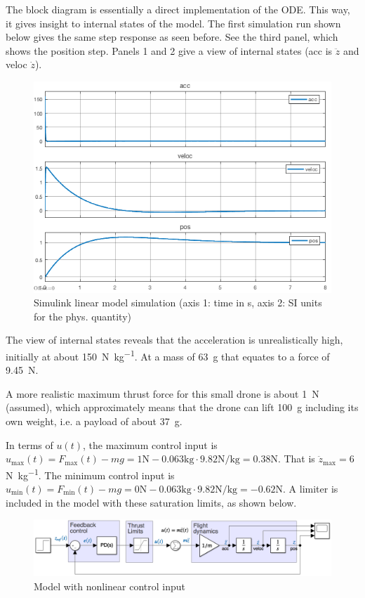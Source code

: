 \documentclass[a4paper]{report}
\begin{document}
The block diagram is essentially a direct implementation of the \gls{ODE}. This way, it gives insight to internal states of the model.
The first simulation run shown below gives the same step response as seen before.
See the third panel, which shows the position step.
Panels 1 and 2 give a view of internal states (acc is $\ddot{z}$ and veloc $\dot{z}$).

\begin{figure}[H]
\centering
\includegraphics[width=12cm]{img/simulink_1d_sim1.png}
\caption{Simulink linear model simulation (axis 1: time in \si{\second}, axis 2: SI units for the phys. quantity) \label{fig:simulink_1d_sim1}}
\end{figure}

The view of internal states reveals that the acceleration is unrealistically high, initially at about \SI{150}{\newton\per\kilo\gram}. 
At a mass of \SI{63}{\gram} that equates to a force of \SI{9.45}{\newton}.

A more realistic maximum thrust force for this small drone is about \SI{1}{\newton} (assumed), which approximately means that the drone can lift \SI{100}{\gram} including its own weight, i.e. a payload of about \SI{37}{\gram}.

In terms of $u(t)$, the maximum control input is $u_\text{max}(t) = F_\text{max}(t)-mg=1 \text{N} - 0.063 \text{kg}\cdot 9.82 \text{N/kg} = 0.38 \text{N}$. 
That is $\ddot{z}_\text{max}=6$ \si{\newton\per\kilo\gram}.
The minimum control input is $u_\text{min}(t) = F_\text{min}(t)-mg=0 \text{N} - 0.063 \text{kg}\cdot 9.82 \text{N/kg} = - 0.62 \text{N}$.
A limiter is included in the model with these saturation limits, as shown below.

\begin{figure}[H]
\centering
\includegraphics[width=14cm]{img/simulink_1d_2.png}
\caption{Model with nonlinear control input\label{fig:simulink_1d_2}}
\end{figure}
\end{document}
